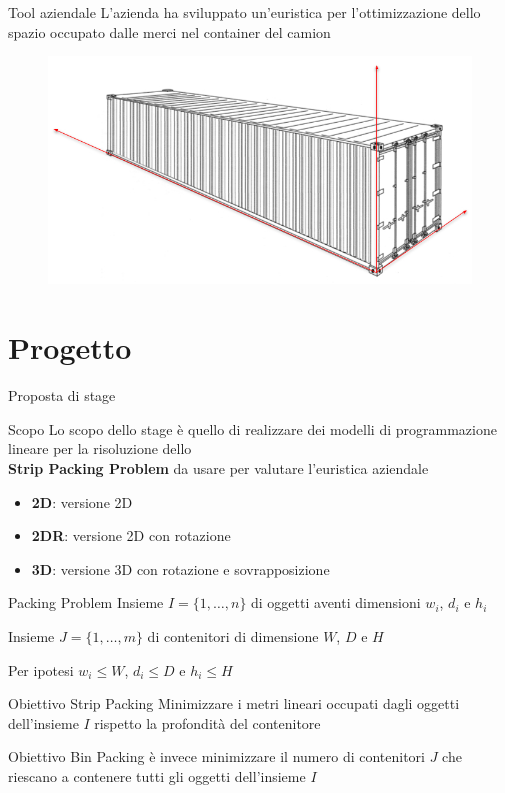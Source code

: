 \documentclass{beamer}
\begin{document}
\begin{frame}{Tool aziendale}
	L'azienda ha sviluppato un'euristica per l'ottimizzazione dello spazio occupato dalle merci nel container del camion
	\begin{figure}[H]
		\begin{center} \includegraphics[width=1\linewidth]{figures/container_arrows}
		\end{center}
	\end{figure}
\end{frame}

\section{Progetto}
\begin{frame}{Proposta di stage}
	\begin{alertblock}{Scopo}
		Lo scopo dello stage \`e  quello di realizzare dei modelli di programmazione lineare per la risoluzione dello \\ \textbf{Strip Packing Problem} da usare per valutare l'euristica aziendale
	\end{alertblock}
	\begin{itemize}
		\item \textbf{2D}: versione 2D
		\item \textbf{2DR}: versione 2D con rotazione
		\item \textbf{3D}: versione 3D con rotazione e sovrapposizione
	\end{itemize}
\end{frame}

\begin{frame}{Packing Problem}
	Insieme $I = \{1,\dots,n\}$ di oggetti aventi dimensioni $w_{i}$, $d_{i}$ e $h_{i}$	
																		
	Insieme $J = \{1,\dots,m\}$ di contenitori di dimensione $W$, $D$ e $H$
																
	Per ipotesi $w_{i} \leq W$, $d_{i} \leq D$ e $h_{i} \leq H$
	\vspace{.5em}
	\begin{alertblock}{Obiettivo Strip Packing}
		Minimizzare i metri lineari occupati dagli oggetti dell'insieme $I$ rispetto la profondit\`a del contenitore
	\end{alertblock}	
	Obiettivo Bin Packing \`e invece minimizzare il numero di contenitori $J$ che riescano a contenere tutti gli oggetti dell'insieme $I$
\end{frame}
\end{document}
